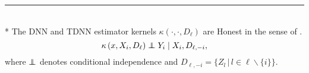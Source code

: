 \hrule

\begin{lem}\label{lem:honesty}\mbox{}\\*
	The DNN and TDNN estimator kernels $\kappa\left(\cdot, \cdot, D_{\ell}\right)$ are Honest in the sense of \citet{wager_estimation_2018}.
	\begin{equation*}
		\kappa\left(x, X_{i}, D_{\ell}\right) \perp\!\!\!\!\perp Y_{i} \mid X_{i}, D_{\ell,-i},
	\end{equation*}
	where $\perp\!\!\!\!\perp$ denotes conditional independence and $D_{\ell,-i} = \{Z_l \, | \, l \in \ell \backslash \{i\}\}$.
\end{lem}